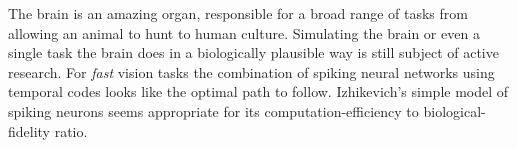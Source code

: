 The brain is an amazing organ, responsible for a broad range of tasks from allowing an animal to hunt to human culture. Simulating the brain or even a single task the brain does in a biologically plausible way is still subject of active research. For \emph{fast} vision tasks the combination of spiking neural networks using temporal codes looks like the optimal path to follow. Izhikevich's simple model of spiking neurons seems appropriate for its computation-efficiency to biological-fidelity ratio.
